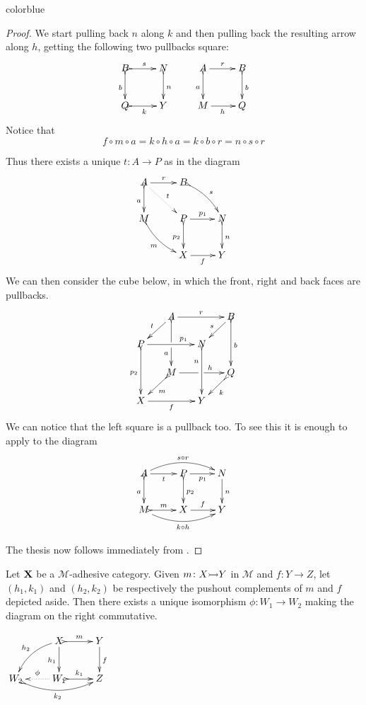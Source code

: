 \documentclass[a4paper,UKenglish,cleveref,pdftex,thm-restate,numberwithinsect]{lipics-v2021}
\newcommand{\full}[1]{{color{blue}#1}}
\newcommand{\full}[1]{}
\newcommand{\mto}[0]{\scalebox{1}{$\rightarrowtail$}}
\def\X{\textbf {\textup{X}}}
\begin{document}
\full{ 
\begin{proof}
	We start pulling back $n$ along $k$ and then pulling back the resulting arrow along $h$, getting the following two pullbacks square:
	\[\xymatrix{B \ar@{>->}[d]_{b}\ar@{>->}[r]^{s}& N \ar@{>->}[d]^{n} & A \ar[r]^{r} \ar@{>->}[d]_{a}& B \ar@{>->}[d]^{b}\\Q\ar@{>->}[r]_{k}&Y &M \ar[r]_h&Q\\}\]
	Notice that
	\[
		f\circ m\circ a=k\circ h\circ a=k\circ b\circ r=n\circ s\circ r\]

	Thus there exists a unique $t\colon A\to P$ as in the diagram
	\[\xymatrix{A \ar@{>->}[d]_{a} \ar@{.>}[dr]^{t}\ar[r]^{r} &B \ar@{>->}@/^.2cm/[dr]^{s} \\ M \ar@{>->}@/_.2cm/[dr]_{m}&P\ar[r]^{p_1}  \ar@{>->}[d]_{p_2}& N \ar@{>->}[d]^{n}\\ &X \ar[r]_{f} & Y}\]
	We can then consider the cube below, in which the front, right and back faces are pullbacks.
	\[\xymatrix@C=15pt@R=15pt{&A\ar@{>->}[dd]|\hole_(.65){a}\ar[rr]^{r} \ar[dl]_{t} && B \ar@{>->}[dd]^{b} \ar[dl]_{s} \\ P  \ar@{>->}[dd]_{p_2}\ar[rr]^(.7){p_1} & & N \ar@{>->}[dd]_(.3){n}\\&M\ar[rr]|\hole^(.65){h} \ar@{>->}[dl]^{m} && Q \ar@{>->}[dl]^{k} \\X \ar[rr]_{f} & & Y}\]
	We can notice that the left square is a pullback too. To see this it is enough to apply \Cref{lem:pb1} to the diagram
	\[\xymatrix{A  \ar@/^.4cm/[rr]^{s\circ r}\ar@{>->}[d]_{a} \ar[r]_{t}& \ar[r]_{p_1} P \ar@{>->}[d]^{p_2}& N \ar[d]^{n}\\ M \ar@/_.4cm/[rr]_{k\circ h}\ar@{>->}[r]^{m}& X \ar[r]^{f}& Y}\]

	The thesis now follows immediately from \Cref{lem:varie}. \qedhere
\end{proof}
}
\noindent
\parbox{10cm}{
	\begin{corollary}\label{lem:pocomp}
		Let $\X$ be a $\mathcal{M}$-adhesive category. Given $m\colon X\mto Y$ in $\mathcal{M}$ and $f\colon Y\to Z$, let $(h_1, k_1)$ and $(h_2, k_2)$ be respectively the pushout complements of $m$  and $f$ depicted aside. Then there exists a unique isomorphism $\phi\colon W_1\to W_2$ making the diagram on the right commutative.
	\end{corollary}}
\parbox{3cm}{\vspace{1em}$\xymatrix{&X \ar@{>->}[r]^{m} \ar[d]_{h_1} \ar@/_.3cm/[dl]_{h_2}& Y \ar[d]^{f} \\ W_2 \ar@{>->}@/_.4cm/[rr]_{k_2} &W_1 \ar@{.>}[l]_{\phi} \ar@{>->}[r]^{k_1} & Z }$}
\end{document}
